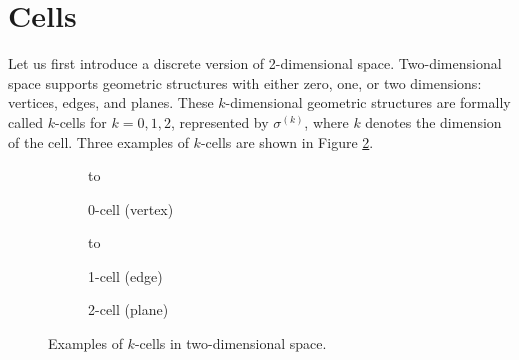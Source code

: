 \section{Cells}

Let us first introduce a discrete version of 2-dimensional space. Two-dimensional space supports geometric structures with either zero, one, or two dimensions: vertices, edges, and planes. These $k$-dimensional geometric structures are formally called $k$-cells for $k = 0, 1, 2$, represented by $\sigma^{(k)}$, where $k$ denotes the dimension of the cell. Three examples of $k$-cells are shown in Figure \ref{fig:cells}.
\begin{figure}[ht]
    \newsavebox\boxCell
    \centering
    \begin{subfigure}[c]{0.3\textwidth}
        \centering
        \vbox to \ht{}
        \caption{0-cell (vertex)}
    \end{subfigure}
    \begin{subfigure}[c]{0.3\textwidth}
        \centering
        \vbox to \ht{}
        \caption{1-cell (edge)}
    \end{subfigure}
    \begin{subfigure}[c]{0.3\textwidth}
        \centering
        \usebox{\boxCell}
        \caption{2-cell (plane)}
        \label{fig:2cell}
    \end{subfigure}
    \caption{Examples of $k$-cells in two-dimensional space.}
    \label{fig:cells}
\end{figure}

